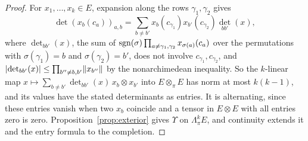 \begin{proof}
For $x_1,\dots,x_k\in E$, expansion along the rows $\gamma_1,\gamma_2$ gives
\[
 \det(x_b(c_a))_{a,b}=\sum_{b\ne b'}x_b(c_{\gamma_1})x_{b'}(c_{\gamma_2})\det_{bb'}(x),
\]
where $\det_{bb'}(x)$, the sum of
$\operatorname{sgn}(\sigma)\prod_{a\ne\gamma_1,\gamma_2}x_{\sigma(a)}(c_a)$ over the permutations with $\sigma(\gamma_1)=b$ and
$\sigma(\gamma_2)=b'$, does not involve $c_{\gamma_1},c_{\gamma_2}$, and
$\lvert \det_{bb'}(x)\rvert\le\prod_{b''\ne b,b'}\lVert x_{b''}\rVert$ by the nonarchimedean inequality. So the $k$\nobreakdash-linear
map $x\mapsto\sum_{b\ne b'}\det_{bb'}(x)\,x_b\otimes x_{b'}$ into $E\otimes_\pi E$ has norm at most $k(k-1)$, and its
values have the stated determinants as entries. It is alternating, since these entries vanish when two $x_b$ coincide
and a tensor in $E\otimes E$ with all entries zero is zero. Proposition~\ref{prop:exterior} gives $\Upsilon$ on
$\Lambda^k_\pi E$, and continuity extends it and the entry formula to the completion.
\end{proof}

